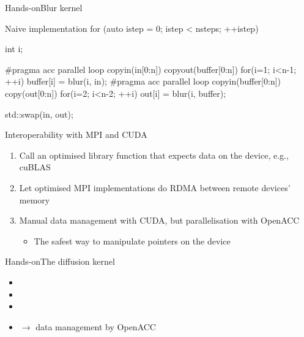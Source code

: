 \documentclass[12pt,aspectratio=169]{beamer}
\begin{document}
\begin{frame}[fragile]{Hands-on}{Blur kernel}
  \begin{Cpplisting}{Naive implementation}
for (auto istep = 0; istep < nsteps; ++istep) {
    int i;

    #pragma acc parallel loop copyin(in[0:n]) copyout(buffer[0:n])
    for(i=1; i<n-1; ++i) {
        buffer[i] = blur(i, in);
    }
    #pragma acc parallel loop copyin(buffer[0:n]) copy(out[0:n])
    for(i=2; i<n-2; ++i) {
        out[i] = blur(i, buffer);
    }

    std::swap(in, out);
}
  \end{Cpplisting}
\end{frame}

\begin{frame}[fragile]{Interoperability with MPI and CUDA}
  \begin{enumerate}
  \item Call an optimised library function that expects data on the device,
    e.g., cuBLAS
  \item Let optimised MPI implementations do RDMA between remote devices' memory
  \item Manual data management with CUDA, but parallelisation with OpenACC
    \begin{itemize}
    \item The safest way to manipulate pointers on the device
    \end{itemize}
  \end{enumerate}
\end{frame}

\begin{frame}{Hands-on}{The diffusion kernel}
  \begin{itemize}
  \item {}
  \item {}
  \item {}
  \item {} $\rightarrow$ data management by OpenACC
  \end{itemize}
\end{frame}
\end{document}
